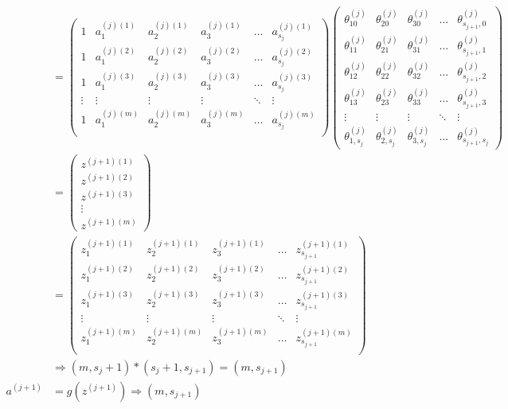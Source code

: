 \begin{enumerate}
\begin{equation}
\begin{aligned}
		\\ &= 
		  \left(\begin{matrix}
				1 & a_1^{(j)(1)} & a_2^{(j)(1)} & a_3^{(j)(1)} & \dots & a_{s_j}^{(j)(1)} \\
				1 & a_1^{(j)(2)} & a_2^{(j)(2)} & a_3^{(j)(2)} & \dots & a_{s_j}^{(j)(2)} \\
				1 & a_1^{(j)(3)} & a_2^{(j)(3)} & a_3^{(j)(3)} & \dots & a_{s_j}^{(j)(3)} \\
				\vdots        & \vdots    & \vdots    & \vdots    & \ddots & \vdots   \\
				1 & a_1^{(j)(m)} & a_2^{(j)(m)} & a_3^{(j)(m)} & \dots & a_{s_j}^{(j)(m)} \\
			\end{matrix}\right)
			\left(\begin{matrix}
				\theta_{10}^{(j)} & \theta_{20}^{(j)} & \theta_{30}^{(j)} & \dots & \theta_{s_{j+1},0}^{(j)} \\
				\theta_{11}^{(j)} & \theta_{21}^{(j)} & \theta_{31}^{(j)} & \dots & \theta_{s_{j+1},1}^{(j)} \\
				\theta_{12}^{(j)} & \theta_{22}^{(j)} & \theta_{32}^{(j)} & \dots & \theta_{s_{j+1},2}^{(j)} \\
				\theta_{13}^{(j)} & \theta_{23}^{(j)} & \theta_{33}^{(j)} & \dots & \theta_{s_{j+1},3}^{(j)} \\
				\vdots    & \vdots    & \vdots    & \ddots & \vdots   \\
				\theta_{1,s_j}^{(j)} & \theta_{2,s_j}^{(j)} & \theta_{3,s_j}^{(j)} & \dots & \theta_{s_{j+1},s_j}^{(j)}
			\end{matrix}\right)
		\\ &=
			\left(\begin{matrix}
				z^{(j+1)(1)} \\ z^{(j+1)(2)} \\ z^{(j+1)(3)} \\ \vdots \\ z^{(j+1)(m)} 
			\end{matrix}\right)
		\\ &= 
			\left(\begin{matrix}
				z_1^{(j+1)(1)} & z_2^{(j+1)(1)} & z_3^{(j+1)(1)} & \dots & z_{s_{j+1}}^{(j+1)(1)} \\
				z_1^{(j+1)(2)} & z_2^{(j+1)(2)} & z_3^{(j+1)(2)} & \dots & z_{s_{j+1}}^{(j+1)(2)} \\
				z_1^{(j+1)(3)} & z_2^{(j+1)(3)} & z_3^{(j+1)(3)} & \dots & z_{s_{j+1}}^{(j+1)(3)} \\
				\vdots & \vdots & \vdots & \ddots & \vdots \\
				z_1^{(j+1)(m)} & z_2^{(j+1)(m)} & z_3^{(j+1)(m)} & \dots & z_{s_{j+1}}^{(j+1)(m)} \\
			\end{matrix}\right)
		\\ & \Rightarrow (m,s_j+1) * (s_j+1, s_{j+1}) = (m,s_{j+1}) \\
	a^{(j+1)} &= g(z^{(j+1)})  \Rightarrow {(m,s_{j+1})} 
\end{aligned}\end{equation}
\end{enumerate}

